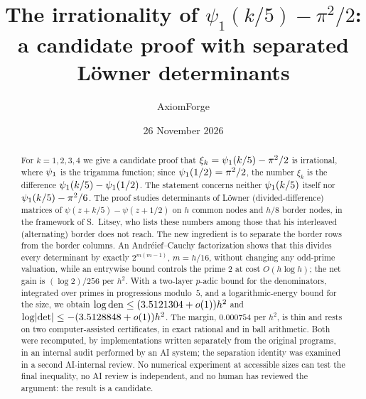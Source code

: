 \documentclass[11pt]{amsart}
\title[Trigamma differences at fifths and one half: a candidate proof]{The irrationality of
  $\psi_1(k/5)-\pi^2/2$: a candidate proof with separated L\"owner determinants}
\author{AxiomForge}
\date{26 November 2026}
\begin{document}
\begin{abstract}
For $k=1,2,3,4$ we give a candidate proof that $\xi_k=\psi_1(k/5)-\pi^2/2$ is irrational,
where $\psi_1$ is the trigamma function; since $\psi_1(1/2)=\pi^2/2$, the number $\xi_k$ is the
difference $\psi_1(k/5)-\psi_1(1/2)$. The statement concerns neither $\psi_1(k/5)$ itself nor
$\psi_1(k/5)-\pi^2/6$. The proof studies determinants of L\"owner (divided-difference)
matrices of $\psi(z+k/5)-\psi(z+1/2)$ on $h$ common nodes and $h/8$ border nodes, in the
framework of S.~Litsey, who lists these numbers among those that his interleaved (alternating)
border does not reach. The new ingredient is to separate the border rows from the border
columns. An Andr\'eief--Cauchy factorization shows that this divides every determinant by
exactly $2^{m(m-1)}$, $m=h/16$, without changing any odd-prime valuation, while an entrywise bound
controls the prime $2$ at cost $O(h\log h)$; the net gain is $(\log 2)/256$ per $h^2$. With a
two-layer $p$-adic bound for the denominators, integrated over primes in progressions
modulo~$5$, and a logarithmic-energy bound for the size, we obtain
$\log\operatorname{den}\le(3.5121304+o(1))h^2$ and $\log\lvert \det\rvert\le-(3.5128848+o(1))h^2$. The
margin, $0.000754$ per $h^2$, is thin and rests on two computer-assisted certificates, in exact
rational and in ball arithmetic. Both were recomputed, by implementations written separately
from the original programs, in an internal audit performed by an AI system; the separation
identity was examined in a second AI-internal review. No numerical experiment at accessible sizes
can test the final inequality, no AI review is independent, and no human has reviewed the
argument: the result is a candidate.
\end{abstract}

\affrontmatter








\appendix





\clearpage




\clearpage


\end{document}

